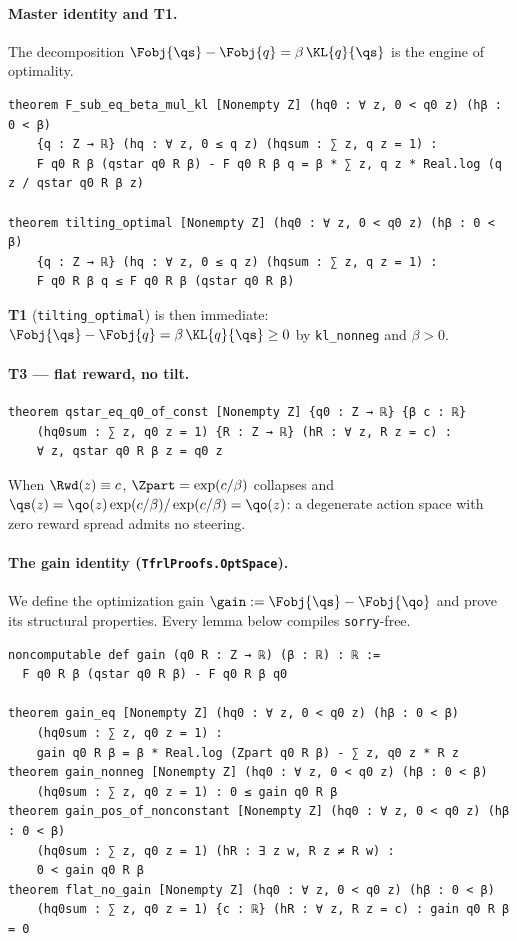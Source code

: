 \paragraph{Master identity and T1.}
The decomposition $\Fobj{\qs}-\Fobj{q}=\beta\,\KL{q}{\qs}$ is the engine of optimality.

\begin{verbatim}
theorem F_sub_eq_beta_mul_kl [Nonempty Z] (hq0 : ∀ z, 0 < q0 z) (hβ : 0 < β)
    {q : Z → ℝ} (hq : ∀ z, 0 ≤ q z) (hqsum : ∑ z, q z = 1) :
    F q0 R β (qstar q0 R β) - F q0 R β q = β * ∑ z, q z * Real.log (q z / qstar q0 R β z)

theorem tilting_optimal [Nonempty Z] (hq0 : ∀ z, 0 < q0 z) (hβ : 0 < β)
    {q : Z → ℝ} (hq : ∀ z, 0 ≤ q z) (hqsum : ∑ z, q z = 1) :
    F q0 R β q ≤ F q0 R β (qstar q0 R β)
\end{verbatim}

\noindent
\textbf{T1} (\texttt{tilting\_optimal}) is then immediate: $\Fobj{\qs}-\Fobj{q}=\beta\,\KL{q}{\qs}\ge 0$
by \texttt{kl\_nonneg} and $\beta>0$.

\paragraph{T3 --- flat reward, no tilt.}
\begin{verbatim}
theorem qstar_eq_q0_of_const [Nonempty Z] {q0 : Z → ℝ} {β c : ℝ}
    (hq0sum : ∑ z, q0 z = 1) {R : Z → ℝ} (hR : ∀ z, R z = c) :
    ∀ z, qstar q0 R β z = q0 z
\end{verbatim}
\noindent
When $\Rwd(z)\equiv c$, $\Zpart=\exp(c/\beta)$ collapses and
$\qs(z)=\qo(z)\exp(c/\beta)/\exp(c/\beta)=\qo(z)$: a degenerate action space with zero reward spread
admits no steering.

\paragraph{The gain identity (\texttt{TfrlProofs.OptSpace}).}
We define the optimization gain $\gain:=\Fobj{\qs}-\Fobj{\qo}$ and prove its structural properties.
Every lemma below compiles \texttt{sorry}-free.

\begin{verbatim}
noncomputable def gain (q0 R : Z → ℝ) (β : ℝ) : ℝ :=
  F q0 R β (qstar q0 R β) - F q0 R β q0

theorem gain_eq [Nonempty Z] (hq0 : ∀ z, 0 < q0 z) (hβ : 0 < β)
    (hq0sum : ∑ z, q0 z = 1) :
    gain q0 R β = β * Real.log (Zpart q0 R β) - ∑ z, q0 z * R z
theorem gain_nonneg [Nonempty Z] (hq0 : ∀ z, 0 < q0 z) (hβ : 0 < β)
    (hq0sum : ∑ z, q0 z = 1) : 0 ≤ gain q0 R β
theorem gain_pos_of_nonconstant [Nonempty Z] (hq0 : ∀ z, 0 < q0 z) (hβ : 0 < β)
    (hq0sum : ∑ z, q0 z = 1) (hR : ∃ z w, R z ≠ R w) :
    0 < gain q0 R β
theorem flat_no_gain [Nonempty Z] (hq0 : ∀ z, 0 < q0 z) (hβ : 0 < β)
    (hq0sum : ∑ z, q0 z = 1) {c : ℝ} (hR : ∀ z, R z = c) : gain q0 R β = 0
\end{verbatim}

